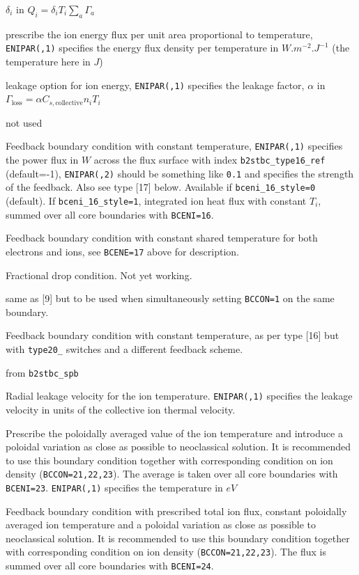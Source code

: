\documentclass[a4paper,10pt]{report}
\begin{document}
\begin{description}
\begin{description}
  $\delta_i$ in $Q_i = \delta_i T_i \sum_a \Gamma_a$
  \item[13] prescribe the ion energy flux per unit area proportional
  to temperature, {\tt ENIPAR(,1)} specifies the energy flux density
  per temperature in $W.m^{-2}.J^{-1}$ (the temperature here in $J$)
  \item[14] leakage option for ion energy, {\tt ENIPAR(,1)} specifies
  the leakage factor, $\alpha$ in $\Gamma_{\mbox{loss}} = \alpha C_{s,\mbox{collective}} n_i T_i$
  \item[15] not used
  \item[16] Feedback boundary condition with constant temperature,
    {\tt ENIPAR(,1)} specifies the power flux in $W$ across the flux surface
    with index {\tt b2stbc\_type16\_ref} (default=-1), {\tt ENIPAR(,2)}
    should be something like {\tt 0.1} and specifies the strength of the
    feedback. Also see type [17] below. Available if {\tt bceni\_16\_style=0} (default).
    If {\tt bceni\_16\_style=1}, integrated ion heat flux with constant $T_i$, summed over all core boundaries with {\tt BCENI=16}.
  \item[17] Feedback boundary condition with constant shared temperature
    for both electrons and ions, see {\tt BCENE=17} above for description.
  \item[18] Fractional drop condition. Not yet working.
  \item[19] same as [9] but to be used when simultaneously setting {\tt BCCON=1} on the same boundary.
  \item[20] Feedback boundary condition with constant temperature,
  as per type [16] but with {\tt type20\_} switches and a different
  feedback scheme.
  \item[21] from {\tt b2stbc\_spb}
  \item[22] Radial leakage velocity for the ion temperature.
  {\tt ENIPAR(,1)} specifies the leakage velocity in units of the collective ion thermal velocity.
  \item[23] Prescribe the poloidally averaged value of the ion temperature and introduce a poloidal variation as close as possible to neoclassical solution. It is recommended to use this boundary condition together with corresponding condition on ion density ({\tt BCCON=21,22,23}). The average is taken over all core boundaries with {\tt BCENI=23}.
  {\tt ENIPAR(,1)} specifies the temperature in $eV$
  \item[24] Feedback boundary condition with prescribed total ion flux, constant poloidally averaged ion temperature and a poloidal variation as close as possible to neoclassical solution. It is recommended to use this boundary condition together with corresponding condition on ion density ({\tt BCCON=21,22,23}). The flux is summed over all core boundaries with {\tt BCENI=24}.

\end{description}
\end{description}
\end{document}
